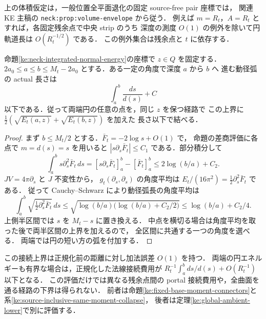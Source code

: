 上の体積仮定は，一般位置全平面退化の固定 source-free pair 座標では，
関連 KE 主稿の \texttt{neck:prop:volume-envelope} から従う．
例えば $m=R_t$，$A=R_t$ とすれば，各固定残余点で中央 strip のうち
深度の測度 $O(1)$ の例外を除いて円軌道長は $O(R_t^{-1/2})$ である．
この例外集合は残余点と $t$ に依存する．

\begin{corollary}[鋭い係数を持つ同一残余点での法線接続上界]
\label{ke:neck-axial-upper}
命題\ref{ke:neck-integrated-normal-energy}の座標で $z\in Q$ を固定する．
$2a_0\le a\le b\le M_t-2a_0$ とする．ある一定の角度で深度 $a$ から $b$ へ
進む動径弧の actual 長さは
\[
 \int_a^b \frac{ds}{d(s)}+C
\]
以下である．従って両端円の任意の点を，同じ $z$ を保つ経路で
この上界に $\tfrac12(\sqrt{E_t(a,z)}+\sqrt{E_t(b,z)})$ を加えた
長さ以下で結べる．
\end{corollary}

\begin{proof}
まず $b\le M_t/2$ とする．$\bar F_t=-2\log s+O(1)$ で，
命題の差商評価に各点で $m=d(s)=s$ を用いると $|s\partial_s\bar F_t|\le C_1$
である．部分積分して
\[
 \int_a^b s\partial_s^2\bar F_t\,ds
 =[s\partial_s\bar F_t]_a^b-[\bar F_t]_a^b
 \le 2\log(b/a)+C_2 .
\]
$JV=4\pi\partial_s$ と $J$ 不変性から，
$g_t(\partial_s,\partial_s)$ の角度平均は
$E_t/(16\pi^2)=\tfrac12\partial_s^2\bar F_t$ である．
従って Cauchy--Schwarz により動径弧長の角度平均は
\[
 \int_a^b \sqrt{\tfrac12\partial_s^2\bar F_t}\,ds
 \le \sqrt{\log(b/a)\bigl(\log(b/a)+C_2/2\bigr)}
 \le \log(b/a)+C_2/4 .
\]
上側半区間では $s$ を $M_t-s$ に置き換える．
中点を横切る場合は角度平均を取った後で両半区間の上界を加えるので，
全区間に共通する一つの角度を選べる．
両端では円の短い方の弧を付加する．
\end{proof}

この接続上界は正規化前の距離に対し加法誤差 $O(1)$ を持つ．
両端の円エネルギーも有界な場合は，正規化した法線接続費用が
$R_t^{-1}\int_a^b ds/d(s)+O(R_t^{-1})$ 以下となる．
この評価だけでは異なる残余点間の portal 接続費用や，全曲面を通る経路の下界は得られない．
前者は命題\ref{ke:fixed-base-moment-connectors}と
系\ref{ke:source-inclusive-same-moment-collapse}，
後者は定理\ref{ke:global-ambient-lower}で別に評価する．

